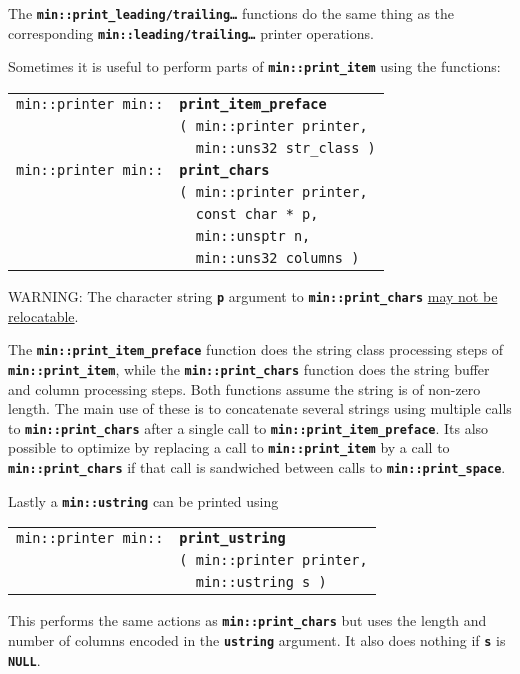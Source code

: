 \documentclass[12pt]{article}
\makeatletter
\newcommand{\TT}[1]{{\tt \bfseries #1}}
\newcommand{\ttindex}[1]{\index{#1@{\tt #1}}}
\newcommand{\EOL}{\penalty \exhyphenpenalty}
\newenvironment{indpar}[1][0.3in]%
	{\begin{list}{}%
		     {\setlength{\itemsep}{0in}%
		      \setlength{\topsep}{0in}%
		      \setlength{\parsep}{1ex}%
		      \setlength{\labelwidth}{#1}%
		      \setlength{\leftmargin}{#1}%
		      \addtolength{\leftmargin}{\labelsep}}%
	 \item}%
	{\end{list}}
\newcommand{\LABEL}[1]{\label{#1}}
\newlength{\ARGBREAKLENGTH}
\newcommand{\ARGBREAK}[1][\ARGBREAKLENGTH]{\\&\hspace*{#1}}
\newcommand{\MINKEY}[1]%
	   {\TT{#1}\ttindex{min::#1}\ttindex{#1}}
\makeatother
\begin{document}
The \TT{min::print\_leading/trailing\ldots} functions do the same thing as the
corresponding \TT{min::\EOL leading/\EOL trailing\ldots} printer operations.

Sometimes it is useful to perform parts of \TT{min::\EOL print\_\EOL item}
using the functions:

\begin{indpar}[1em]\begin{tabular}{r@{}l}
\verb|min::printer min::| & \MINKEY{print\_item\_preface}\ARGBREAK
	\verb|( min::printer printer,|\ARGBREAK
	\verb|  min::uns32 str_class )|
\LABEL{MIN::PRINT_ITEM_PREFACE} \\
\verb|min::printer min::| & \MINKEY{print\_chars}\ARGBREAK
	\verb|( min::printer printer,|\ARGBREAK
	\verb|  const char * p,|\ARGBREAK
	\verb|  min::unsptr n,|\ARGBREAK
	\verb|  min::uns32 columns )|
\LABEL{MIN::PRINT_CHARS} \\
\end{tabular}\end{indpar}

WARNING: The character string \TT{p} argument to
\TT{min::\EOL print\_\EOL chars}
\underline{may not be relocatable}.

The \TT{min::print\_item\_preface} function does the string class
processing steps of \TT{min::\EOL print\_\EOL item}, while the
\TT{min::print\_\EOL chars} function does the string buffer and column
processing steps.  Both functions assume the string is of non-zero
length.  The main use of these is to concatenate several strings
using multiple calls to \TT{min::\EOL print\_\EOL chars} after a
single call to \TT{min::\EOL print\_\EOL item\_\EOL preface}.
Its also possible to optimize by replacing a call to
\TT{min::\EOL print\_\EOL item} by a call to
\TT{min::\EOL print\_\EOL chars} if that call is sandwiched between
calls to \TT{min::\EOL print\_\EOL space}.

Lastly a \TT{min::ustring} can be printed using

\begin{indpar}[1em]\begin{tabular}{r@{}l}
\verb|min::printer min::| & \MINKEY{print\_ustring}\ARGBREAK
    \verb|( min::printer printer,|\ARGBREAK
    \verb|  min::ustring s )|
\LABEL{MIN::PRINT_USTRING} \\
\end{tabular}\end{indpar}

This performs the same actions as \TT{min::print\_chars} but
uses the length and number of columns encoded in the
\TT{ustring} argument.  It also does nothing if \TT{s} is \TT{NULL}.
\end{document}
